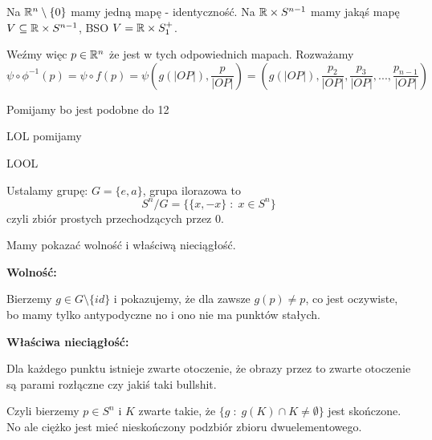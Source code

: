 \documentclass{article}
\begin{document}
Na $\mathbb{R}^n\setminus\{0\}$ mamy jedną mapę - identyczność. Na $\mathbb{R}\times S^{n-1}$ mamy jakąś mapę $V\subseteq \mathbb{R}\times S^{n-1}$, BSO  $V=\mathbb{R}\times S_1^+$.

\begin{center}
\end{center}

Weźmy więc $p\in \mathbb{R}^n$ że jest w tych odpowiednich mapach. Rozważamy
$$\psi\circ\phi^{-1}(p)=\psi\circ f(p)=\psi(g(|OP|), \frac{p}{|OP|})=(g(|OP|),\frac{p_2}{|OP|},\frac{p_3}{|OP|},...,\frac{p_{n-1}}{|OP|})$$

\begin{problem}[13]{}
Pomijamy bo jest podobne do 12
\end{problem}

\begin{problem}[14]{}
LOL pomijamy
\end{problem}

\begin{problem}[15]{}
LOOL
\end{problem}

Ustalamy grupę: $G=\{e, a\}$, grupa ilorazowa to
$$S^n/G=\{\{x, -x\}\;:\;x\in S^n\}$$
czyli zbiór prostych przechodzących przez $0$.

Mamy pokazać wolność i właściwą nieciągłość.

\textbf{Wolność:}

Bierzemy $g\in G\setminus\{id\}$ i pokazujemy, że dla zawsze $g(p)\neq p$, co jest oczywiste, bo mamy tylko antypodyczne no i ono nie ma punktów stałych.

\textbf{Właściwa nieciągłość:}

Dla każdego punktu istnieje zwarte otoczenie, że obrazy przez to zwarte otoczenie są parami rozłączne czy jakiś taki bullshit.

Czyli bierzemy $p\in S^n$ i $K$ zwarte takie, że $\{g\;:\;g(K)\cap K\neq \emptyset\}$ jest skończone. No ale ciężko jest mieć nieskończony podzbiór zbioru dwuelementowego.
\end{document}
